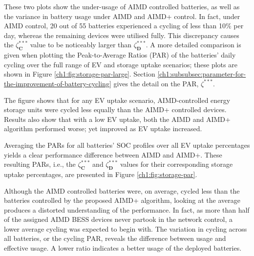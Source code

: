 

These two plots show the under-usage of AIMD controlled batteries, as well as the variance in battery usage under AIMD and AIMD+ control. In fact, under AIMD control, 20 out of 55 batteries experienced a cycling of less than 10\% per day, whereas the remaining devices were utilised fully. This discrepancy causes the $\zeta_\textbf{C}^{***}$ value to be noticeably larger than $\zeta_\textbf{D}^{***}$. A more detailed comparison is given when plotting the Peak-to-Average Ratios (PAR) of the batteries' daily cycling over the full range of EV and storage uptake scenarios; these plots are shown in Figure \ref{ch1:fig:storage-par-large}. Section \ref{ch1:subsubsec:parameter-for-the-improvement-of-battery-cycling} gives the detail on the PAR, $\zeta^{***}$.



The figure shows that for any EV uptake scenario, AIMD-controlled energy storage units were cycled less equally than the AIMD+ controlled devices. Results also show that with a low EV uptake, both the AIMD and AIMD+ algorithm performed worse; yet improved as EV uptake increased.

Averaging the PARs for all batteries' SOC profiles over all EV uptake percentages yields a clear performance difference between AIMD and AIMD+. These resulting PARs, i.e., the $\zeta_\textbf{C}^{***}$ and $\zeta_\textbf{D}^{***}$ values for their corresponding storage uptake percentages, are presented in Figure \ref{ch1:fig:storage-par}.



Although the AIMD controlled batteries were, on average, cycled less than the batteries controlled by the proposed AIMD+ algorithm, looking at the average produces a distorted understanding of the performance. In fact, as more than half of the assigned AIMD BESS devices never partook in the network control, a lower average cycling was expected to begin with. The variation in cycling across all batteries, or the cycling PAR, reveals the difference between usage and effective usage. A lower ratio indicates a better usage of the deployed batteries.